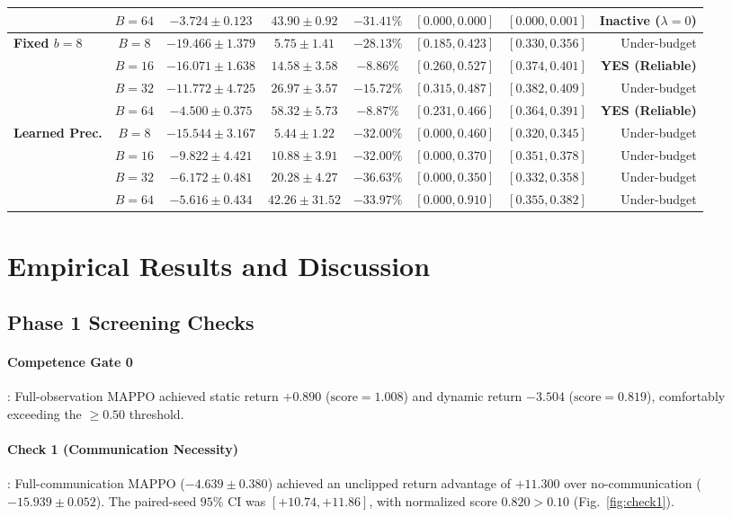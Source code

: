 \documentclass[10pt,twocolumn,letterpaper]{article}
\begin{document}
\begin{table}[t]
\begin{tabular}{lccccccr}
& $B=64$ & $\mathbf{-3.724 \pm 0.123}$ & $43.90 \pm 0.92$ & $-31.41\%$ & $[0.000, 0.000]$ & $[0.000, 0.001]$ & Inactive ($\lambda=0$) \\
\midrule
\textbf{Fixed $b=8$} & $B=8$ & $-19.466 \pm 1.379$ & $5.75 \pm 1.41$ & $-28.13\%$ & $[0.185, 0.423]$ & $[0.330, 0.356]$ & Under-budget \\
& $B=16$ & $-16.071 \pm 1.638$ & $14.58 \pm 3.58$ & \textbf{$-8.86\%$} & $[0.260, 0.527]$ & $[0.374, 0.401]$ & \textbf{YES (Reliable)} \\
& $B=32$ & $-11.772 \pm 4.725$ & $26.97 \pm 3.57$ & $-15.72\%$ & $[0.315, 0.487]$ & $[0.382, 0.409]$ & Under-budget \\
& $B=64$ & $-4.500 \pm 0.375$ & $58.32 \pm 5.73$ & \textbf{$-8.87\%$} & $[0.231, 0.466]$ & $[0.364, 0.391]$ & \textbf{YES (Reliable)} \\
\midrule
\textbf{Learned Prec.} & $B=8$ & $-15.544 \pm 3.167$ & $5.44 \pm 1.22$ & $-32.00\%$ & $[0.000, 0.460]$ & $[0.320, 0.345]$ & Under-budget \\
& $B=16$ & $-9.822 \pm 4.421$ & $10.88 \pm 3.91$ & $-32.00\%$ & $[0.000, 0.370]$ & $[0.351, 0.378]$ & Under-budget \\
& $B=32$ & $-6.172 \pm 0.481$ & $20.28 \pm 4.27$ & $-36.63\%$ & $[0.000, 0.350]$ & $[0.332, 0.358]$ & Under-budget \\
& $B=64$ & $-5.616 \pm 0.434$ & $42.26 \pm 31.52$ & $-33.97\%$ & $[0.000, 0.910]$ & $[0.355, 0.382]$ & Under-budget \\
\bottomrule
\end{tabular}
\end{table}

\section{Empirical Results and Discussion}

\subsection{Phase 1 Screening Checks}
\paragraph{Competence Gate 0}: Full-observation MAPPO achieved static return $+0.890$ ($\text{score} = 1.008$) and dynamic return $-3.504$ ($\text{score} = 0.819$), comfortably exceeding the $\ge 0.50$ threshold.
\paragraph{Check 1 (Communication Necessity)}: Full-communication MAPPO ($-4.639 \pm 0.380$) achieved an unclipped return advantage of $\mathbf{+11.300}$ over no-communication ($-15.939 \pm 0.052$). The paired-seed $95\%$ CI was $[+10.74, +11.86]$, with normalized score $0.820 > 0.10$ (Fig.~\ref{fig:check1}).
\end{document}
